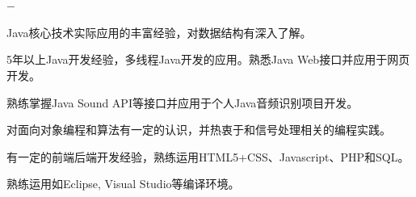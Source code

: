 \documentclass[UTF8]{ctexart}
\newcommand{\lineunder}{\vspace*{-8pt} \\
\hspace*{-18pt} \hrulefill \\}
\newcommand{\header}[1]{\large \vspace*{12pt}{\Large \hspace*{-15pt}\vspace*{6pt} \textsc{#1}} \vspace*{-6pt} \lineunder}
\newenvironment{summaries}{
\begin{list}
        {$-$}{\topsep 3pt
        \itemsep 0pt \vspace*{2pt}}}{\vspace*{4pt}
\end{list}
}
\begin{document}
\header{概况}
\begin{summaries}
    \item Java核心技术实际应用的丰富经验，对数据结构有深入了解。
    \item 5年以上Java开发经验，多线程Java开发的应用。熟悉Java Web接口并应用于网页开发。
    \item 熟练掌握Java Sound API等接口并应用于个人Java音频识别项目开发。
    \item 对面向对象编程和算法有一定的认识，并热衷于和信号处理相关的编程实践。
    \item 有一定的前端后端开发经验，熟练运用HTML5+CSS、Javascript、PHP和SQL。
    \item 熟练运用如Eclipse, Visual Studio等编译环境。

\end{summaries}
\end{document}
